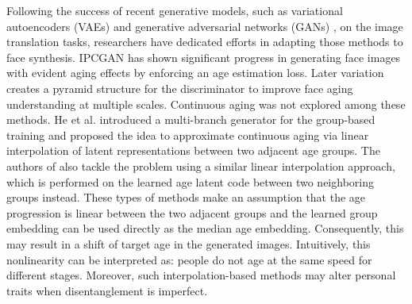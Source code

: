 \documentclass[final]{cvpr}
\begin{document}
Following the success of recent generative models, such as variational autoencoders (VAEs) and generative adversarial networks (GANs) \cite{goodfellow2014generative}, on the image translation tasks, researchers have dedicated efforts in adapting those methods to face synthesis. IPCGAN \cite{wang2018face} has shown significant progress in generating face images with evident aging effects by enforcing an age estimation loss.  Later variation \cite{yang2018learning} creates a pyramid structure for the discriminator to improve face aging understanding at multiple scales. Continuous aging was not explored among these methods. He et al. \cite{he2019s2gan} introduced a multi-branch generator for the group-based training and proposed the idea to approximate continuous aging via linear interpolation of latent representations between two adjacent age groups. The authors of \cite{orel2020lifespan} also tackle the problem using a similar linear interpolation approach, which is performed on the learned age latent code between two neighboring groups instead. These types of methods make an assumption that the age progression is linear between the two adjacent groups and the learned group embedding can be used directly as the median age embedding. Consequently, this may result in a shift of target age in the generated images. Intuitively, this nonlinearity can be interpreted as: people do not age at the same speed for different stages. Moreover, such interpolation-based methods may alter personal traits when disentanglement is imperfect. 
\end{document}
